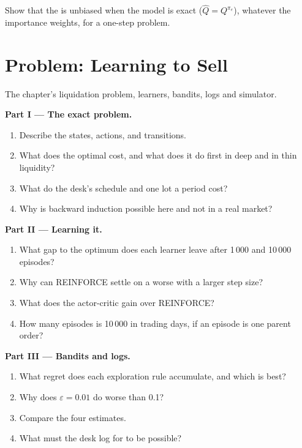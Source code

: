 \begin{exercise}[$\star\star\star$]\label{exo:ml:reinforcement-learning-foundations:8}
Show that the  is unbiased when the model is exact ($\hat Q = Q^{\pi_e}$), whatever the importance
weights, for a one-step problem.
\end{exercise}

\section{Problem: Learning to Sell}

\begin{problem}\label{pb:ml:reinforcement-learning-foundations:1}
The chapter's liquidation problem, learners, bandits, logs and simulator.

\medskip\noindent\textbf{Part I --- The exact problem.}
\begin{enumerate}
\item Describe the states, actions,  and transitions.
\item What does the optimal  cost, and what does it do first in deep and in thin liquidity?
\item What do the desk's schedule and one lot a period cost?
\item Why is backward induction possible here and not in a real market?
\end{enumerate}

\medskip\noindent\textbf{Part II --- Learning it.}
\begin{enumerate}[resume]
\item What gap to the optimum does each learner leave after 1\,000 and 10\,000 episodes?
\item Why can REINFORCE settle on a worse  with a larger step size?
\item What does the actor-critic gain over REINFORCE?
\item How many episodes is 10\,000 in trading days, if an episode is one parent order?
\end{enumerate}

\medskip\noindent\textbf{Part III --- Bandits and logs.}
\begin{enumerate}[resume]
\item What regret does each exploration rule accumulate, and which is best?
\item Why does $\varepsilon = 0.01$ do worse than 0.1?
\item Compare the four  estimates.
\item What must the desk log for  to be possible?
\end{enumerate}


\end{problem}
